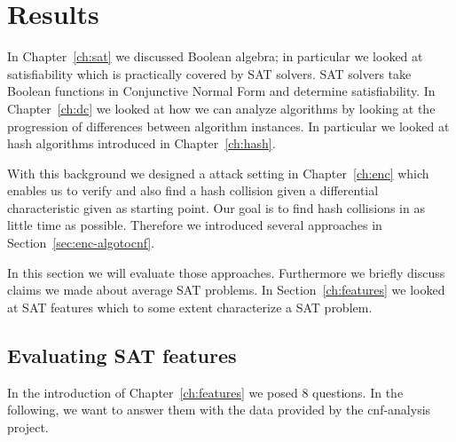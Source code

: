 \renewcommand*\chappic{img/megosat.pdf}
\renewcommand*\chapquote{}
\renewcommand*\chapquotesrc{}
\chapter{Results}
\label{ch:results}
%
In Chapter~\ref{ch:sat} we discussed Boolean algebra; in particular we looked at
satisfiability which is practically covered by SAT solvers. SAT solvers take
Boolean functions in Conjunctive Normal Form and determine satisfiability.
In Chapter~\ref{ch:dc} we looked at how we can analyze algorithms by looking
at the progression of differences between algorithm instances. In particular
we looked at hash algorithms introduced in Chapter~\ref{ch:hash}.

With this background we designed a attack setting in Chapter~\ref{ch:enc}
which enables us to verify and also find a hash collision given a differential
characteristic given as starting point. Our goal is to find hash collisions
in as little time as possible. Therefore we introduced several approaches
in Section~\ref{sec:enc-algotocnf}.

In this section we will evaluate those approaches. Furthermore we briefly
discuss claims we made about average SAT problems. In Section~\ref{ch:features}
we looked at SAT features which to some extent characterize a SAT problem.

\section{Evaluating SAT features}
\label{sec:results-features}
%
In the introduction of Chapter~\ref{ch:features} we posed 8 questions.
In the following, we want to answer them with the data provided by the
cnf-analysis project.

